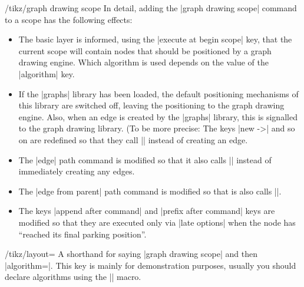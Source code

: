 \begin{key}{/tikz/graph drawing scope}
  In detail, adding the |graph drawing scope| command to a scope has
  the following effects:
  \begin{itemize}
  \item The basic layer is informed, using the
    |execute at begin scope| key, that the current scope will contain
    nodes that should be positioned by a graph drawing engine. Which
    algorithm is used depends on the value of the |algorithm| key.
  \item If the |graphs| library has been loaded, the default
    positioning mechanisms of this library are switched off, leaving
    the positioning to the graph drawing engine. Also, when an edge is
    created by the |graphs| library, this is signalled to the graph
    drawing library. (To be more precise: The keys |new ->| and so on
    are redefined so that they call |\pgfgdedge| instead of creating
    an edge.
  \item The |edge| path command is modified so that it also calls
    |\pgfgdedge| instead of immediately creating any edges.
  \item The |edge from parent| path command is modified so that is
    also calls |\pgfgdedge|.
  \item The keys |append after command| and |prefix after command|
    keys are modified so that they are executed only via
    |late options| when the node has ``reached its final parking
    position''. 
  \end{itemize}
\end{key}

\begin{key}{/tikz/layout=}
  A shorthand for saying |graph drawing scope| and then
  |algorithm=|. This key is mainly for demonstration
  purposes, usually you should declare algorithms using the
  |\pgfgddeclarealgorithmkey| macro.
\end{key}



